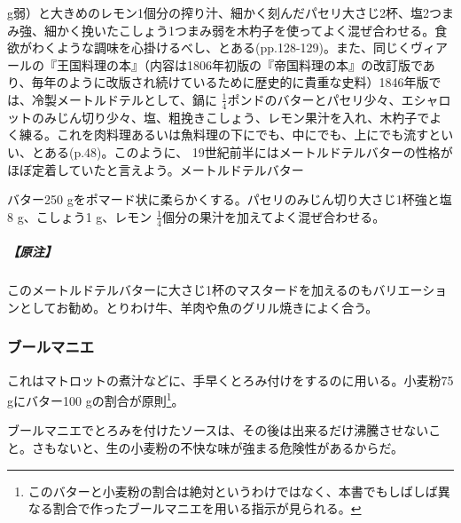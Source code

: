 \begin{recette}
{{{{  g弱）と大きめのレモン1個分の搾り汁、細かく刻んだパセリ大さじ2杯、塩2つまみ強、細かく挽いたこしょう1つまみ弱を木杓子を使ってよく混ぜ合わせる。食欲がわくような調味を心掛けるべし、とある(pp.128-129)。また、同じくヴィアールの『王国料理の本』（内容は1806年初版の『帝国料理の本』の改訂版であり、毎年のように改版され続けているために歴史的に貴重な史料）1846年版では、冷製メートルドテルとして、鍋に
  \(\frac{1}{4}\)ポンドのバターとパセリ少々、エシャロットのみじん切り少々、塩、粗挽きこしょう、レモン果汁を入れ、木杓子でよく練る。これを肉料理あるいは魚料理の下にでも、中にでも、上にでも流すといい、とある(p.48)。このように、
  19世紀前半にはメートルドテルバターの性格がほぼ定着していたと言えよう。}}{メートルドテルバター}}\label{beurre-maitre-d-hotel}}



バター250
gをポマード状に柔らかくする。パセリのみじん切り大さじ1杯強と塩8
g、こしょう1 g、レモン
\(\frac{1}{4}\)個分の果汁を加えてよく混ぜ合わせる。

\hypertarget{nota-beurre-maitre-d-hotel}{%
\subparagraph{【原注】}\label{nota-beurre-maitre-d-hotel}}

このメートルドテルバターに大さじ1杯のマスタードを加えるのもバリエーションとしてお勧め。とりわけ牛、羊肉や魚のグリル焼きによく合う。

\hypertarget{beurre-manie}{%
\subsubsection{ブールマニエ}\label{beurre-manie}}


 

これはマトロットの煮汁などに、手早くとろみ付けをするのに用いる。小麦粉75
gにバター100 gの割合が原則\footnote{このバターと小麦粉の割合は絶対というわけではなく、本書でもしばしば異なる割合で作ったブールマニエを用いる指示が見られる。}。

ブールマニエでとろみを付けたソースは、その後は出来るだけ沸騰させないこと。さもないと、生の小麦粉の不快な味が強まる危険性があるからだ。


\end{recette}
